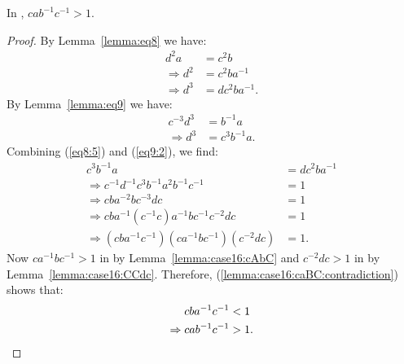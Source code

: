 \begin{lemma} In , $cab^{-1}c^{-1}>1$.
\label{lemma:case16:caBC}
\end{lemma}
\begin{proof}
By Lemma~\ref{lemma:eq8} we have:
\begin{align}
d^{2}a&=c^{2}b\nonumber{}\\
\Rightarrow{}d^{2}&=c^{2}ba^{-1}\nonumber{}\\
\Rightarrow{}d^{3}&=dc^{2}ba^{-1}.\label{eq8:5}
\end{align}
By Lemma~\ref{lemma:eq9} we have:
\begin{align}
c^{-3}d^{3}&=b^{-1}a\nonumber{}\\
\Rightarrow{}d^{3}&=c^{3}b^{-1}a.\label{eq9:2}
\end{align}
Combining (\ref{eq8:5}) and (\ref{eq9:2}), we find:
\begin{align}
c^{3}b^{-1}a&=dc^{2}ba^{-1}\nonumber{}\\
\Rightarrow{}c^{-1}d^{-1}c^{3}b^{-1}a^{2}b^{-1}c^{-1}&=1\nonumber{}\\
\Rightarrow{}cba^{-2}bc^{-3}dc&=1\label{eq12}\\
\Rightarrow{}cba^{-1}(c^{-1}c)a^{-1}bc^{-1}c^{-2}dc&=1\nonumber{}\\
\Rightarrow{}(cba^{-1}c^{-1})(ca^{-1}bc^{-1})(c^{-2}dc)&=1.\label{lemma:case16:caBC:contradiction}
\end{align}
Now $ca^{-1}bc^{-1}>1$ in  by Lemma~\ref{lemma:case16:cAbC} and $c^{-2}dc>1$ in  by Lemma~\ref{lemma:case16:CCdc}. Therefore, (\ref{lemma:case16:caBC:contradiction}) shows that:
\begin{align*}
cba^{-1}c^{-1}&<1\\
\Rightarrow{}cab^{-1}c^{-1}&>1.\qedhere
\end{align*}
\end{proof}

